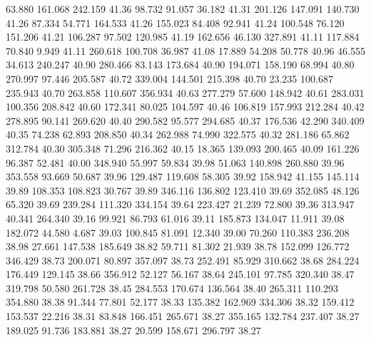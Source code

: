   63.880  161.068  242.159        41.36
  98.732   91.057   36.182        41.31
 201.126  147.091  140.730        41.26
  87.334   54.771  164.533        41.26
 155.023   84.408   92.941        41.24
 100.548   76.120  151.206        41.21
 106.287   97.502  120.985        41.19
 162.656   46.130  327.891        41.11
 117.884   70.840    9.949        41.11
 260.618  100.708   36.987        41.08
  17.889   54.208   50.778        40.96
  46.555   34.613  240.247        40.90
 280.466   83.143  173.684        40.90
 194.071  158.190   68.994        40.80
 270.997   97.446  205.587        40.72
 339.004  144.501  215.398        40.70
  23.235  100.687  235.943        40.70
 263.858  110.607  356.934        40.63
 277.279   57.600  148.942        40.61
 283.031  100.356  208.842        40.60
 172.341   80.025  104.597        40.46
 106.819  157.993  212.284        40.42
 278.895   90.141  269.620        40.40
 290.582   95.577  294.685        40.37
 176.536   42.290  340.409        40.35
  74.238   62.893  208.850        40.34
 262.988   74.990  322.575        40.32
 281.186   65.862  312.784        40.30
 305.348   71.296  216.362        40.15
  18.365  139.093  200.465        40.09
 161.226   96.387   52.481        40.00
 348.940   55.997   59.834        39.98
  51.063  140.898  260.880        39.96
 353.558   93.669   50.687        39.96
 129.487  119.608   58.305        39.92
 158.942   41.155  145.114        39.89
 108.353  108.823   30.767        39.89
 346.116  136.802  123.410        39.69
 352.085   48.126   65.320        39.69
 239.284  111.320  334.154        39.64
 223.427   21.239   72.800        39.36
 313.947   40.341  264.340        39.16
  99.921   86.793   61.016        39.11
 185.873  134.047   11.911        39.08
 182.072   44.580    4.687        39.03
 100.845   81.091   12.340        39.00
  70.260  110.383  236.208        38.98
  27.661  147.538  185.649        38.82
  59.711   81.302   21.939        38.78
 152.099  126.772  346.429        38.73
 200.071   80.897  357.097        38.73
 252.491   85.929  310.662        38.68
 284.224  176.449  129.145        38.66
 356.912   52.127   56.167        38.64
 245.101   97.785  320.340        38.47
 319.798   50.580  261.728        38.45
 284.553  170.674  136.564        38.40
 265.311  110.293  354.880        38.38
  91.344   77.801   52.177        38.33
 135.382  162.969  334.306        38.32
 159.412  153.537   22.216        38.31
  83.848  166.451  265.671        38.27
 355.165  132.784  237.407        38.27
 189.025   91.736  183.881        38.27
  20.599  158.671  296.797        38.27

